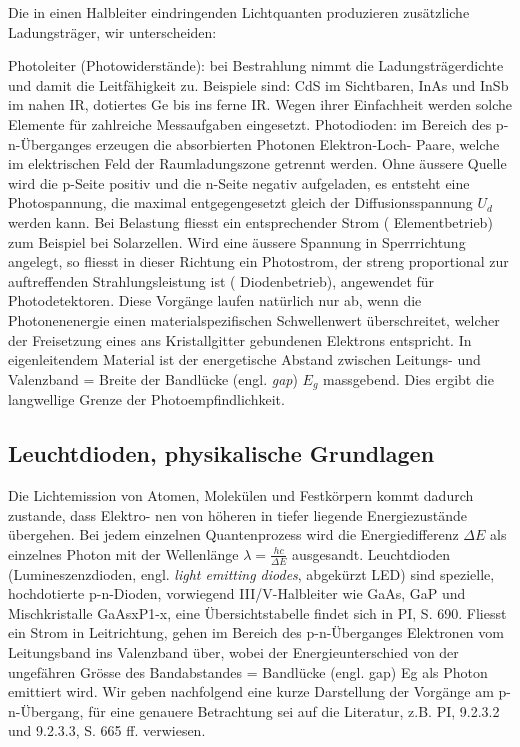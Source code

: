 Die in einen  Halbleiter  eindringenden Lichtquanten produzieren zus\"atzliche
Ladungstr\"ager, wir unterscheiden:

Photoleiter     (Photowiderst\"ande):     bei    Bestrahlung     nimmt     die
Ladungstr\"agerdichte und damit die Leitf\"ahigkeit zu. Beispiele sind: CdS im
Sichtbaren, InAs und InSb im nahen IR, dotiertes Ge bis ins  ferne  IR.  Wegen
ihrer  Einfachheit  werden  solche  Elemente  f\"ur  zahlreiche   Messaufgaben
eingesetzt.   Photodioden:  im  Bereich  des  p-n-\"Uberganges  erzeugen   die
absorbierten Photonen Elektron-Loch- Paare, welche im  elektrischen  Feld  der
Raumladungszone  getrennt  werden. Ohne  \"aussere  Quelle  wird  die  p-Seite
positiv und  die  n-Seite  negativ aufgeladen, es entsteht eine Photospannung,
die  maximal entgegengesetzt gleich der Diffusionsspannung $U_d$ werden  kann.
Bei Belastung  fliesst ein entsprechender Strom ( Elementbetrieb) zum Beispiel
bei Solarzellen. Wird eine \"aussere Spannung  in  Sperrrichtung  angelegt, so
fliesst  in  dieser  Richtung  ein Photostrom,  der  streng  proportional  zur
auftreffenden  Strahlungsleistung   ist  (  Diodenbetrieb),  angewendet  f\"ur
Photodetektoren.  Diese   Vorg\"ange  laufen  nat\"urlich  nur  ab,  wenn  die
Photonenenergie  einen  materialspezifischen  Schwellenwert   \"uberschreitet,
welcher  der  Freisetzung  eines  ans   Kristallgitter   gebundenen  Elektrons
entspricht.  In  eigenleitendem Material ist der energetische Abstand zwischen
Leitungs-  und  Valenzband = Breite der Bandl\"ucke (engl. \textit{gap}) $E_g$
massgebend.  Dies  ergibt  die  langwellige Grenze  der  Photoempfindlichkeit.


\subsection{Leuchtdioden, physikalische Grundlagen}

Die Lichtemission von  Atomen,  Molek\"ulen  und  Festk\"orpern  kommt dadurch
zustande, dass Elektro- nen von h\"oheren in tiefer liegende Energiezust\"ande
\"ubergehen.  Bei  jedem  einzelnen  Quantenprozess wird die  Energiedifferenz
$\Delta  E$  als   einzelnes   Photon   mit   der   Wellenl\"ange  $\lambda  =
\frac{hc}{\Delta  E}$  ausgesandt.  Leuchtdioden   (Lumineszenzdioden,   engl.
\textit{light  emitting diodes}, abgek\"urzt LED) sind spezielle, hochdotierte
p-n-Dioden,  vorwiegend  III/V-Halbleiter wie  GaAs,  GaP  und  Mischkristalle
GaAsxP1-x,  eine  \"Ubersichtstabelle  findet sich in PI, S. 690. Fliesst  ein
Strom in  Leitrichtung,  gehen  im Bereich des p-n-\"Uberganges Elektronen vom
Leitungsband  ins Valenzband \"uber,  wobei  der  Energieunterschied  von  der
ungef\"ahren  Gr\"osse  des Bandabstandes = Bandl\"ucke  (engl.  gap)  Eg  als
Photon emittiert wird.  Wir  geben  nachfolgend  eine  kurze  Darstellung  der
Vorg\"ange am p-n-\"Ubergang, f\"ur  eine  genauere  Betrachtung  sei  auf die
Literatur, z.B. PI, 9.2.3.2 und 9.2.3.3, S. 665 ff. verwiesen.

